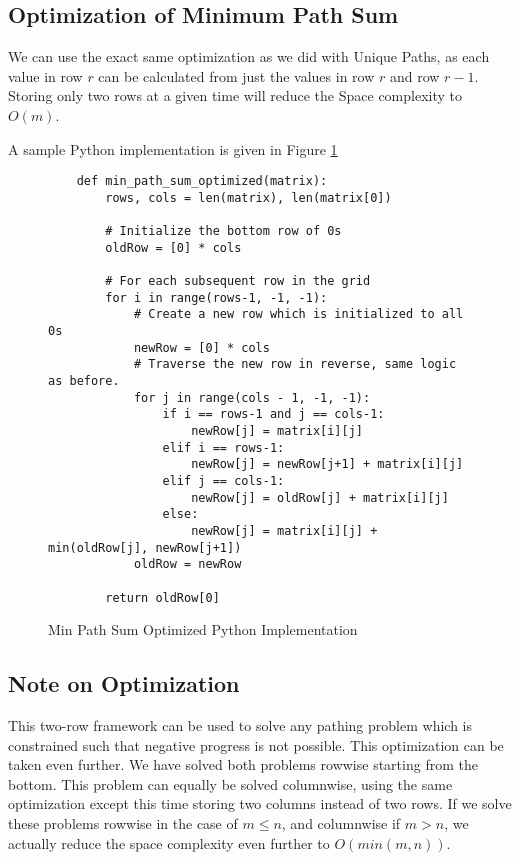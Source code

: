 \subsection{Optimization of Minimum Path Sum}
We can use the exact same optimization as we did with Unique Paths, as each value in row $r$ can be calculated from just the values in row $r$ and row $r-1$.
Storing only two rows at a given time will reduce the Space complexity to $O(m)$.

A sample Python implementation is given in Figure \ref{fig:min-path-sum-optimized}
\begin{figure}[H]
    \centering
    \begin{lstlisting}
    def min_path_sum_optimized(matrix):
        rows, cols = len(matrix), len(matrix[0])
        
        # Initialize the bottom row of 0s
        oldRow = [0] * cols
    
        # For each subsequent row in the grid
        for i in range(rows-1, -1, -1):
            # Create a new row which is initialized to all 0s
            newRow = [0] * cols
            # Traverse the new row in reverse, same logic as before.
            for j in range(cols - 1, -1, -1):
                if i == rows-1 and j == cols-1:
                    newRow[j] = matrix[i][j]
                elif i == rows-1:
                    newRow[j] = newRow[j+1] + matrix[i][j]
                elif j == cols-1:
                    newRow[j] = oldRow[j] + matrix[i][j]
                else:
                    newRow[j] = matrix[i][j] + min(oldRow[j], newRow[j+1])
            oldRow = newRow
    
        return oldRow[0]
    \end{lstlisting}
    \caption{Min Path Sum Optimized Python Implementation}
    \label{fig:min-path-sum-optimized}
\end{figure}
\subsection{Note on Optimization}
This two-row framework can be used to solve any pathing problem which is constrained such that negative progress is not possible.
This optimization can be taken even further. We have solved both problems rowwise starting from the bottom. This problem can equally be solved columnwise,
using the same optimization except this time storing two columns instead of two rows.
If we solve these problems rowwise in the case of $m \leq n$, and columnwise if $m > n$, we actually reduce the space complexity even further to $O(min(m,n))$.